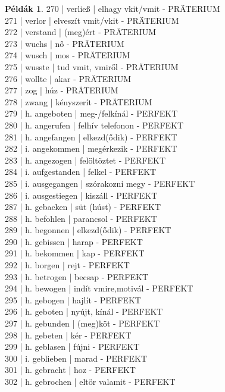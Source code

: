 \documentclass{article}
\theoremstyle{definition}
\newtheorem*{exmp}{Példák}
\begin{document}
\begin{exmp}
270 | verließ | elhagy vkit/vmit - PRÄTERIUM\\
271 | verlor | elveszít vmit/vkit - PRÄTERIUM\\
272 | verstand | (meg)ért - PRÄTERIUM\\
273 | wuchs | nő - PRÄTERIUM\\
274 | wusch | mos - PRÄTERIUM\\
275 | wusste | tud vmit, vmiről - PRÄTERIUM\\
276 | wollte | akar - PRÄTERIUM\\
277 | zog | húz - PRÄTERIUM\\
278 | zwang | kényszerít - PRÄTERIUM\\
279 | h. angeboten | meg-/felkínál - PERFEKT\\
280 | h. angerufen | felhív telefonon - PERFEKT\\
281 | h. angefangen | elkezd(ődik) - PERFEKT\\
282 | i. angekommen | megérkezik - PERFEKT\\
283 | h. angezogen | felöltöztet - PERFEKT\\
284 | i. aufgestanden | felkel - PERFEKT\\
285 | i. ausgegangen | szórakozni megy - PERFEKT\\
286 | i. ausgestiegen | kiszáll - PERFEKT\\
287 | h. gebacken | süt (húst) - PERFEKT\\
288 | h. befohlen | parancsol - PERFEKT\\
289 | h. begonnen | elkezd(ődik) - PERFEKT\\
290 | h. gebissen | harap - PERFEKT\\
291 | h. bekommen | kap - PERFEKT\\
292 | h. borgen | rejt - PERFEKT\\
293 | h. betrogen | becsap - PERFEKT\\
294 | h. bewogen | indít vmire,motivál - PERFEKT\\
295 | h. gebogen | hajlít - PERFEKT\\
296 | h. geboten | nyújt, kínál - PERFEKT\\
297 | h. gebunden | (meg)köt - PERFEKT\\
298 | h. gebeten | kér - PERFEKT\\
299 | h. geblasen | fújni - PERFEKT\\
300 | i. geblieben | marad - PERFEKT\\
301 | h. gebracht | hoz - PERFEKT\\
302 | h. gebrochen | eltör valamit - PERFEKT\\

\end{exmp}
\end{document}

